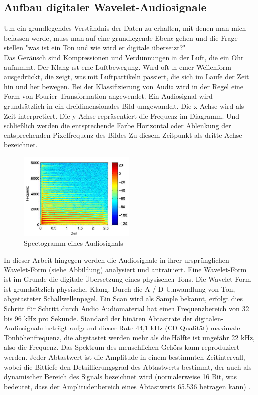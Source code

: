 \documentclass[a4paper,11pt]{article}
\theoremstyle{mytheor}
\begin{document}
\subsection{Aufbau digitaler Wavelet-Audiosignale}
Um ein grundlegendes Verständnis der Daten zu erhalten, mit denen man mich befassen werde, muss man auf eine grundlegende Ebene gehen und die Frage stellen "was ist ein Ton und wie wird er digitale übersetzt?"\\
Das Geräusch sind Kompressionen und Verdünnungen in der Luft, die ein Ohr aufnimmt. Der Klang ist eine Luftbewegung. Wird oft in einer Wellenform ausgedrückt, die zeigt, was mit Luftpartikeln passiert, die sich im Laufe der Zeit hin und her bewegen. Bei der Klassifizierung von Audio wird in der Regel eine Form von Fourier Transformation angewendet. Ein Audiosignal wird grundsätzlich in ein dreidimensionales Bild umgewandelt. Die x-Achse wird als Zeit interpretiert. Die y-Achse repräsentiert die Frequenz im Diagramm. Und schließlich werden die entsprechende Farbe Horizontal oder Ablenkung der entsprechenden Pixelfrequenz des Bildes Zu diesem Zeitpunkt als dritte Achse bezeichnet. 
\begin{figure}
	\centering
	\includegraphics[width=0.5\textwidth]{spectrogram.png}
	\caption [Spectogramm eines Audiosignals] {Spectogramm eines Audiosignals \footnotemark}
	\end{figure}
In dieser Arbeit hingegen werden die Audiosignale in ihrer ursprünglichen Wavelet-Form (siehe Abbildung) analysiert und
antrainiert. Eine Wavelet-Form ist im Grunde die digitale Übersetzung eines
physischen Tons. Die Wavelet-Form ist grundsätzlich physischer Klang. Durch die A / D-Umwandlung von Ton, abgetasteter Schallwellenpegel.  Ein Scan wird als Sample bekannt, erfolgt dies Schritt für Schritt durch Audio Audiomaterial hat einen Frequenzbereich von 32 bis 96 kHz pro Sekunde. Standard der binären Abtastrate der digitalen-Audiosignale beträgt aufgrund dieser Rate 44,1 kHz (CD-Qualität) maximale Tonhöhenfrequenz, die abgetastet werden mehr als die Hälfte ist ungefähr 22 kHz, also die Frequenz. Das Spektrum des menschlichen Gehörs kann reproduziert werden. Jeder Abtastwert ist die Amplitude in einem bestimmten Zeitintervall, wobei die Bittiefe den Detaillierungsgrad des Abtastwerts bestimmt, der auch als dynamischer Bereich des Signals bezeichnet wird (normalerweise 16 Bit, was bedeutet, dass der Amplitudenbereich eines Abtastwerts 65.536 betragen kann) \cite{Abtast}.
\end{document}
